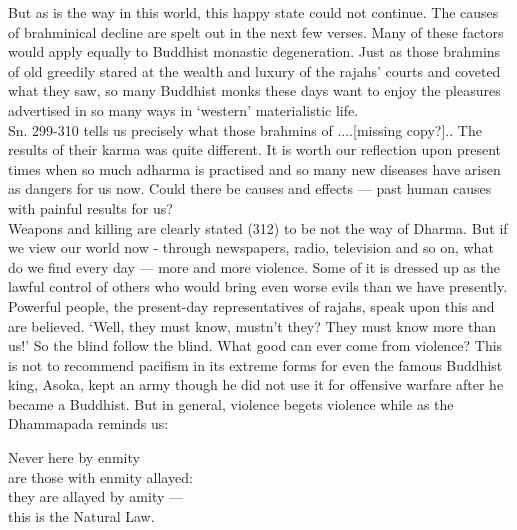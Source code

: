 But as is the way in this world, this happy state could not continue. The causes of brahminical decline are spelt out in the next few verses. Many of these factors would apply equally to Buddhist monastic degeneration. Just as those brahmins of old greedily stared at the wealth and luxury of the rajahs' courts and coveted what they saw, so many Buddhist monks these days want to enjoy the pleasures advertised in so many ways in `western' materialistic life.\\

Sn. 299-310 tells us precisely what those brahmins of ....[missing copy?].. The results of their karma was quite different. It is worth our reflection upon present times when so much adharma is practised and so many new diseases have arisen as dangers for us now. Could there be causes and effects — past human causes with painful results for us?\\

Weapons and killing are clearly stated (312) to be not the way of Dharma. But if we view our world now - through newspapers, radio, television and so on, what do we find every day — more and more violence. Some of it is dressed up as the lawful control of others who would bring even worse evils than we have presently. Powerful people, the present-day representatives of rajahs, speak upon this and are believed. `Well, they must know, mustn't they? They must know more than us!' So the blind follow the blind. What good can ever come from violence? This is not to recommend pacifism in its extreme forms for even the famous Buddhist king, Asoka, kept an army though he did not use it for offensive warfare after he became a Buddhist. But in general, violence begets violence while as the Dhammapada reminds us:

\begin{MyDescription}[]{}
Never here by enmity\\
are those with enmity allayed:\\
they are allayed by amity —\\
this is the Natural Law.
\end{MyDescription}

\begin{MyDescription}[(Dhp. 5)]{}
\end{MyDescription}

